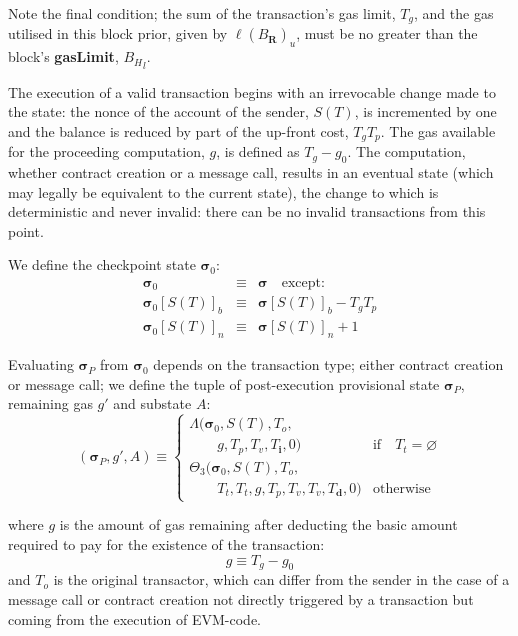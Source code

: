 \documentclass[UTF8,nofonts]{ctexart}
\begin{document}
\begin{multicols}{2}
Note the final condition; the sum of the transaction's gas limit, $T_g$, and the gas utilised in this block prior, given by $\ell(B_\mathbf{R})_u$, must be no greater than the block's \textbf{gasLimit}, ${B_H}_l$. 

The execution of a valid transaction begins with an irrevocable change made to the state: the nonce of the account of the sender, $S(T)$, is incremented by one and the balance is reduced by part of the up-front cost, $T_gT_p$. The gas available for the proceeding computation, $g$, is defined as $T_g - g_0$. The computation, whether contract creation or a message call, results in an eventual state (which may legally be equivalent to the current state), the change to which is deterministic and never invalid: there can be no invalid transactions from this point.

We define the checkpoint state $\boldsymbol{\sigma}_0$:
\begin{eqnarray}
\boldsymbol{\sigma}_0 & \equiv & \boldsymbol{\sigma} \quad \text{except:} \\
\boldsymbol{\sigma}_0[S(T)]_b & \equiv & \boldsymbol{\sigma}[S(T)]_b - T_g T_p \\
\boldsymbol{\sigma}_0[S(T)]_n & \equiv & \boldsymbol{\sigma}[S(T)]_n + 1
\end{eqnarray}

Evaluating $\boldsymbol{\sigma}_P$ from $\boldsymbol{\sigma}_0$ depends on the transaction type; either contract creation or message call; we define the tuple of post-execution provisional state $\boldsymbol{\sigma}_P$, remaining gas $g'$ and substate $A$:
\begin{equation}
(\boldsymbol{\sigma}_P, g', A) \equiv \begin{cases}
\Lambda(\boldsymbol{\sigma}_0, S(T), T_o, &\\ \quad\quad g, T_p, T_v, T_\mathbf{i}, 0) & \text{if} \quad T_t = \varnothing \\
\Theta_{3}(\boldsymbol{\sigma}_0, S(T), T_o, &\\ \quad\quad T_t, T_t, g, T_p, T_v, T_v, T_\mathbf{d}, 0) & \text{otherwise}
\end{cases}
\end{equation}

where $g$ is the amount of gas remaining after deducting the basic amount required to pay for the existence of the transaction:
\begin{equation}
g \equiv T_g - g_0
\end{equation}
and $T_o$ is the original transactor, which can differ from the sender in the case of a message call or contract creation not directly triggered by a transaction but coming from the execution of EVM-code.


\end{multicols}
\end{document}
